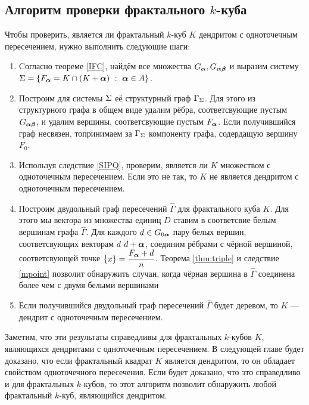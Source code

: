 \subsection{Алгоритм проверки фрактального $k$-куба}

Чтобы проверить, является ли фрактальный $k$-куб $K$ дендритом с одноточечным пересечением, нужно выполнить следующие шаги:

\begin{enumerate}

\item Cогласно теореме \ref{IFC}, найдём все множества $G_{\bm{\alpha}}, G_{{\bm{\alpha}}{\bm{\beta}}}$ и выразим систему $\Sigma=\{F_{\bm{\alpha}}=K\cap(K+{\bm{\alpha}})\ :\ {\bm{\alpha}}\in A\}$.

\item Построим для системы $\Sigma$ её структурный граф $\Gamma_\Sigma$.
Для этого из структурного графа в общем виде удалим рёбра, соответсвующие пустым $G_{{\bm{\alpha}}{\bm{\beta}}}$, и удалим вершины, соответсвующие пустым $F_{{\bm{\alpha}}}$.
Если получившийся граф несвязен, топринимаем за $\Gamma_\Sigma$ компоненту графа, содердащую вершину $F_0$.
 
\item Используя следствие \ref{SIPQ}, проверим, является ли $K$ множеством с одноточечным пересечением.
Если это не так, то $K$ не является дендритом с одноточечным пересечением.
    
\item Построим двудольный граф пересечений $\hat\Gamma$ для фрактального куба $K$.
Для этого мы вектора из множества единиц $D$ ставим в соответсвие белым вершинам графа $\hat\Gamma$.
Для каждого $d\in G_{0{\bm{\alpha}}}$ пару белых вершин, соответсвующих векторам $d$ $d+{\bm{\alpha}}$, соединим рёбрами с чёрной вершиной, соответсвующей точке $\{x\}=\dfrac{F_{\bm{\alpha}}+d}{n}$. 
Теорема \ref{thm:triple} и следствие \ref{mpoint} позволит обнаружить случаи, когда чёрная вершина в $\hat\Gamma$ соединена более чем с двумя белыми вершинами

\item Если получившийся двудольный граф пересечений $\hat\Gamma$ будет деревом, то $K$ --- дендрит с одноточечным пересечением.    
\end{enumerate}

\begin{remark}
Заметим, что эти результаты справедливы для фрактальных $k$-кубов $K$, являющихся дендритами с одноточечным пересечением.
В следующей главе будет доказано, что если фрактальный квадрат $K$ является дендритом, то он обладает свойством одноточечного пересечения.
Если будет доказано, что это справедливо и для фрактальных $k$-кубов, то этот алгоритм позволит обнаружить любой фрактальный $k$-куб, являющийся дендритом.
\end{remark}

